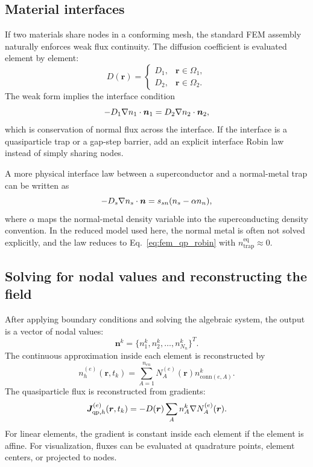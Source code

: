\documentclass[11pt]{article}
\newcommand{\br}{{\bm{r}}}
\newcommand{\trap}{\mathrm{trap}}
\newcommand{\eq}{\mathrm{eq}}
\begin{document}
\subsection{Material interfaces}
If two materials share nodes in a conforming mesh, the standard FEM assembly naturally enforces weak flux continuity. The diffusion coefficient is evaluated element by element:
\begin{equation}
D(\br)=
\begin{cases}
D_1,& \br\in\Omega_1,\\
D_2,& \br\in\Omega_2.
\end{cases}
\end{equation}
The weak form implies the interface condition
\begin{equation}
-D_1\nabla n_1\cdot\bm{n}_1
= D_2\nabla n_2\cdot\bm{n}_2,
\end{equation}
which is conservation of normal flux across the interface. If the interface is a quasiparticle trap or a gap-step barrier, add an explicit interface Robin law instead of simply sharing nodes.

A more physical interface law between a superconductor and a normal-metal trap can be written as
\begin{equation}
-D_s\nabla n_s\cdot\bm{n}=s_{sn}(n_s-\alpha n_n),
\end{equation}
where $\alpha$ maps the normal-metal density variable into the superconducting density convention. In the reduced model used here, the normal metal is often not solved explicitly, and the law reduces to Eq.~\eqref{eq:fem_qp_robin} with $n_{\trap}^{\eq}\approx0$.

\subsection{Solving for nodal values and reconstructing the field}
After applying boundary conditions and solving the algebraic system, the output is a vector of nodal values:
\begin{equation}
\bm{n}^{k}=\{n_1^k,n_2^k,\ldots,n_{N_n}^k\}^T.
\end{equation}
The continuous approximation inside each element is reconstructed by
\begin{equation}
n_h^{(e)}(\br,t_k)=\sum_{A=1}^{n_{en}}N_A^{(e)}(\br)n_{\mathrm{conn}(e,A)}^k.
\label{eq:fem_qp_reconstructed_field}
\end{equation}
The quasiparticle flux is reconstructed from gradients:
\begin{equation}
\bm{J}_{\qp,h}^{(e)}(\br,t_k)=-D(\br)\sum_A n_A^k\nabla N_A^{(e)}(\br).
\label{eq:fem_qp_reconstructed_flux}
\end{equation}
For linear elements, the gradient is constant inside each element if the element is affine. For visualization, fluxes can be evaluated at quadrature points, element centers, or projected to nodes.
\end{document}

